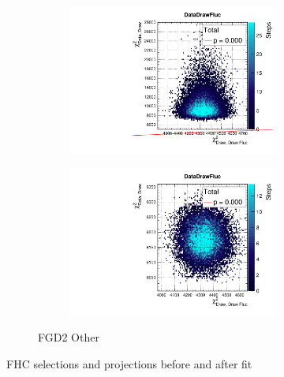 \begin{figure}[h]
\begin{subfigure}[t]{\textwidth}
\begin{subfigure}[t]{0.24\textwidth}
			\includegraphics[width=\textwidth, trim={0mm 0mm 0mm 8mm}, clip,page=56]{figures/mach3/2018/data/2018a_FixedCov_RedCov_Mpi_Data_merge_PriorPred_procs}
		\end{subfigure}
		\begin{subfigure}[t]{0.24\textwidth}
			\includegraphics[width=\textwidth, trim={0mm 0mm 0mm 8mm}, clip,page=56]{figures/mach3/2018/data/2018a_FixedCov_RedCov_Mpi_Data_merge_PostPredStore_FullLLH_procs}
		\end{subfigure}
		\caption{FGD2 Other}
	\end{subfigure}
	\caption{FHC selections \pmu and \cosmu projections before and after fit}
	\label{fig:fhc_postfit_other_2018}
\end{figure}

